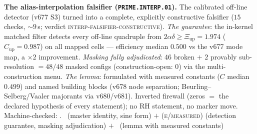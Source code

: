 \par\smallskip\noindent\textbf{The alias-interpolation falsifier
(\texttt{PRIME.INTERP.01}).}
The calibrated off-line detector (v677 S3) turned into a complete,
explicitly constructive falsifier ($15$ checks, ${\sim}9$\,s;
verdict \textsc{interp-falsifier-constructive}).  \emph{The
guarantee}: the in-kernel matched filter detects every off-line
quadruple from $2\alpha\delta\ge\Xi_{\mathrm{up}}=1.974$
($C_{\mathrm{up}}=0.987$) on all mapped cells --- efficiency median
$0.500$ vs the v677 mode map, a $\times2$ improvement.
\emph{Masking fully adjudicated}: $46$ broken $+$ $2$ provably
sub-resolution $=48/48$ masked configs (construction-open: $0$) via
the multi-construction menu.  \emph{The lemma}: formulated with
measured constants ($C$ median $0.499$) and named building blocks
(v678 node separation; Beurling--Selberg/Vaaler majorants via
v680/v681).  Inverted firewall (zeros $=$ the declared hypothesis of
every statement); no RH statement, no marker move.
Machine-checked: .
\mE\ (master identity, sine form) $+$ (\textsc{e/measured})
(detection guarantee, masking adjudication) $+$ \mC\ (lemma with
measured constants)
\par\smallskip


